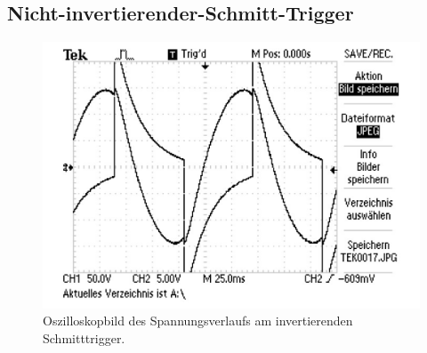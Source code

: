\subsection{Nicht-invertierender-Schmitt-Trigger}
\label{sec:schmitt}
\begin{figure}
    \centering
    \includegraphics[width=1\textwidth]{content/grafiken/schmittTrigger/TEK0017.pdf}
    \caption{Oszilloskopbild des Spannungsverlaufs am invertierenden Schmitttrigger.}
    \label{fig:schmitttrigger}
  \end{figure}





























